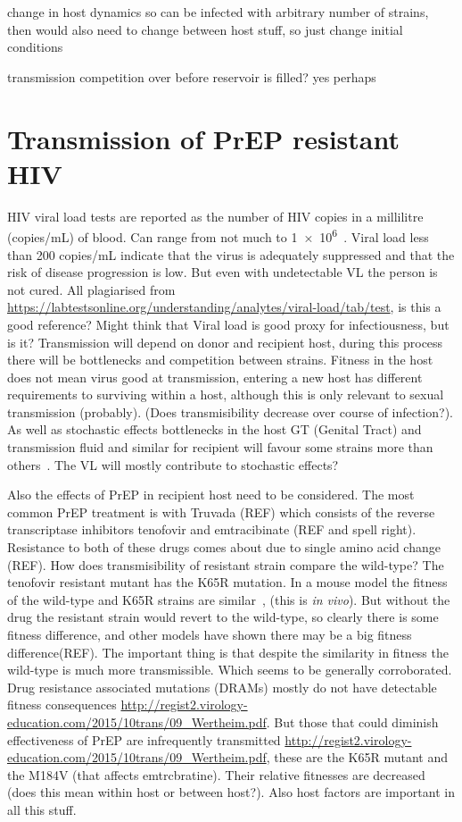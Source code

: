 \documentclass[DIV=15]{scrartcl}
\begin{document}
change in host dynamics so can be infected with arbitrary number of strains, then would also need to change between host stuff, so just change initial conditions

transmission competition over before reservoir is filled? yes perhaps




\section{Transmission of PrEP resistant HIV}

HIV viral load tests are reported as the number of HIV copies in a millilitre (copies/mL) of blood. Can range from not much to \SI{1e6}{}~\citep{fraser2007}.  Viral load less than 
 200 copies/mL indicate that the virus is adequately suppressed and that the risk of disease progression is low. But even with undetectable VL the person is not cured. All plagiarised from \url{https://labtestsonline.org/understanding/analytes/viral-load/tab/test}, is this a good reference? Might think that Viral load is good proxy for infectiousness, but is it? 
Transmission will depend on donor and recipient host, during this process there will be bottlenecks and competition between strains. Fitness in the host does not mean virus good at transmission, entering a new host has different requirements to surviving within a host, although this is only relevant to sexual transmission (probably). (Does transmisibility decrease over course of infection?). As well as stochastic effects bottlenecks in the host GT (Genital Tract) and transmission fluid and similar for recipient will favour some strains more than others~\cite{joseph2015}. The VL will mostly contribute to stochastic effects? 

Also the effects of PrEP in recipient host need to be considered. The most common PrEP treatment is with Truvada (REF) which consists of the reverse transcriptase inhibitors tenofovir and emtracibinate (REF and spell right). Resistance to both of these drugs comes about due to single amino acid change (REF). How does transmisibility of resistant strain compare the wild-type? The tenofovir resistant mutant has the K65R mutation. In a mouse model the fitness of the wild-type and K65R strains are similar~\cite{chateau2013}, (this is   \textit{in vivo}). But without the drug the resistant strain would revert to the wild-type, so clearly there is some fitness difference, and other models have shown there may be a big fitness difference(REF). The important thing is that despite the similarity in fitness the wild-type is much more transmissible. Which seems to  be generally corroborated. Drug resistance associated mutations (DRAMs) mostly do not have detectable fitness consequences 
 \url{http://regist2.virology-education.com/2015/10trans/09_Wertheim.pdf}. But those that could diminish effectiveness of PrEP are infrequently transmitted \url{http://regist2.virology-education.com/2015/10trans/09_Wertheim.pdf}, these are the K65R mutant and the M184V (that affects emtrcbratine). Their relative fitnesses are decreased (does this mean within host or between host?). Also  host factors are important in all this stuff.
\end{document}
